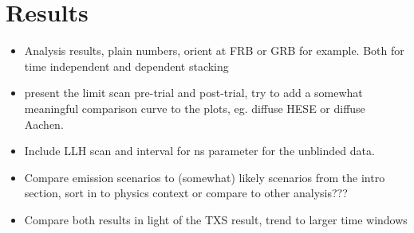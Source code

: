 \chapter{Results}

\begin{itemize}
  \item Analysis results, plain numbers, orient at FRB or GRB for example.
  Both for time independent and dependent stacking
  \item present the limit scan pre-trial and post-trial, try to add a somewhat meaningful comparison curve to the plots, eg. diffuse HESE or diffuse Aachen.
  \item Include LLH scan and interval for ns parameter for the unblinded data.
  \item Compare emission scenarios to (somewhat) likely scenarios from the intro section, sort in to physics context or compare to other analysis???
  \item Compare both results in light of the TXS result, trend to larger time windows
\end{itemize}